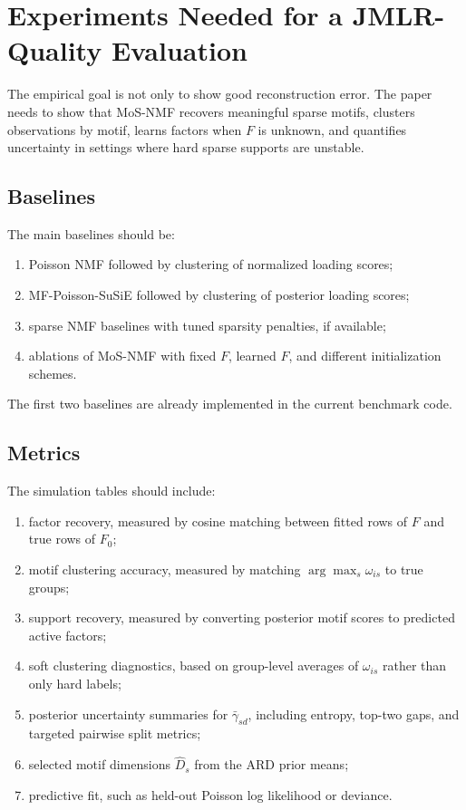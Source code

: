 \documentclass[11pt]{article}
\theoremstyle{definition}
\begin{document}
\section{Experiments Needed for a JMLR-Quality Evaluation}
\label{sec:experiments}

The empirical goal is not only to show good reconstruction error. The paper
needs to show that MoS-NMF recovers meaningful sparse motifs, clusters
observations by motif, learns factors when $F$ is unknown, and quantifies
uncertainty in settings where hard sparse supports are unstable.

\subsection{Baselines}

The main baselines should be:
\begin{enumerate}
  \item Poisson NMF followed by clustering of normalized loading scores;
  \item MF-Poisson-SuSiE followed by clustering of posterior loading scores;
  \item sparse NMF baselines with tuned sparsity penalties, if available;
  \item ablations of MoS-NMF with fixed $F$, learned $F$, and different
  initialization schemes.
\end{enumerate}
The first two baselines are already implemented in the current benchmark code.

\subsection{Metrics}

The simulation tables should include:
\begin{enumerate}
  \item factor recovery, measured by cosine matching between fitted rows of
  $F$ and true rows of $F_0$;
  \item motif clustering accuracy, measured by matching $\arg\max_s\omega_{is}$
  to true groups;
  \item support recovery, measured by converting posterior motif scores to
  predicted active factors;
  \item soft clustering diagnostics, based on group-level averages of
  $\omega_{is}$ rather than only hard labels;
  \item posterior uncertainty summaries for $\bar{\gamma}_{sd}$, including
  entropy, top-two gaps, and targeted pairwise split metrics;
  \item selected motif dimensions $\widehat{D}_s$ from the ARD prior means;
  \item predictive fit, such as held-out Poisson log likelihood or deviance.
\end{enumerate}
\end{document}
